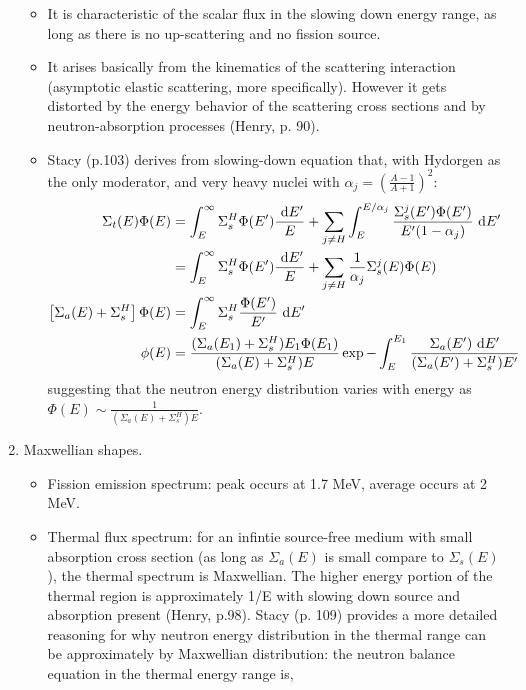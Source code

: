 \documentclass{school-22.211-notes}
\begin{document}
\begin{enumerate}
  \begin{itemize}
  \item It is characteristic of the scalar flux in the slowing down energy range, as long as there is no up-scattering and no fission source. 
  \item It arises basically from the kinematics of the scattering interaction (asymptotic elastic scattering, more specifically). However it gets distorted by the energy behavior of the scattering cross sections and by neutron-absorption processes (Henry, p. 90). 
  \item Stacy (p.103) derives from slowing-down equation that, with Hydorgen as the only moderator, and very heavy nuclei with $\alpha_j = \left(\frac{A-1}{A+1} \right)^2$:
    \begin{align}
      \Sigma_t(E) \Phi(E) &= \int_E^{\infty} \Sigma_s^H \Phi(E')\frac{\mbox{ }\mathrm{d} E'}{E} + \displaystyle\sum_{j\neq H} \int_E^{E/\alpha_j} \frac{\Sigma_s^j (E') \Phi(E')}{E'(1-\alpha_j)} \mbox{ }\mathrm{d} E' \\
      &=  \int_E^{\infty} \Sigma_s^H \Phi(E')\frac{\mbox{ }\mathrm{d} E'}{E} + \displaystyle\sum_{j\neq H} \frac{1}{\alpha_j} \Sigma_s^j (E) \Phi(E) \\
      \left[ \Sigma_a (E) + \Sigma_s^H \right] \Phi(E) &= \int_E^{\infty} \Sigma_s^H \frac{\Phi(E')}{E'} \mbox{ }\mathrm{d} E' \\
      \phi(E) &= \frac{(\Sigma_a (E_1) + \Sigma_s^H) E_1 \Phi (E_1) }{(\Sigma_a(E) + \Sigma_s^H) E} \exp{ - \int_E^{E_1} \frac{\Sigma_a (E') \mbox{ }\mathrm{d}E'}{(\Sigma_a(E') + \Sigma_s^H) E'} }
    \end{align} 
    suggesting that the neutron energy distribution varies with energy as $\Phi(E) \sim \frac{1}{(\Sigma_a(E) + \Sigma_s^H) E}$. 
  \end{itemize}
\item Maxwellian shapes.
  \begin{itemize}
  \item Fission emission spectrum: peak occurs at 1.7 MeV, average occurs at 2 MeV.
  \item Thermal flux spectrum: for an infintie source-free medium with small absorption cross section (as long as $\Sigma_a(E)$ is small compare to $\Sigma_s(E)$), the thermal spectrum is Maxwellian. The higher energy portion of the thermal region is approximately 1/E with slowing down source and absorption present (Henry, p.98). Stacy (p. 109) provides a more detailed reasoning for why neutron energy distribution in the thermal range can be approximately by Maxwellian distribution: the neutron balance equation in the thermal energy range is, 

\end{itemize}
\end{enumerate}
\end{document}
